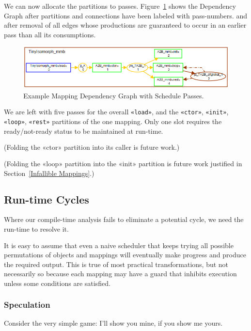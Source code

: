 \documentclass{jot}
\begin{document}
We can now allocate the partitions to passes. Figure~\ref{fig:TinyIsomorphFinal} shows the Dependency Graph after partitions and connections have been labeled with pass-numbers.  and after removal of all edges whose productions are guaranteed to occur in an earlier pass than all its consumptions.  

\begin{figure}[h]
	\centering
	\includegraphics[width=1.0\textwidth]{TinyIsomorphFinal.png}
	\caption{Example Mapping Dependency Graph with Schedule Passes.}
	\label{fig:TinyIsomorphFinal}
\end{figure}

We are left with five passes for the overall \verb|«load»|, and the \verb|«ctor»|, \verb|«init»|, \verb|«loop»|, \verb|«rest»| partitions of the one mapping. Only one slot requires the ready/not-ready status to be maintained at run-time.

(Folding the «ctor» partition into its caller is future work.)

(Folding the «loop» partition into the «init» partition is future work justified in Section~\ref{Infallible Mappings}.)

\subsection{Run-time Cycles}

Where our compile-time analysis fails to eliminate a potential cycle, we need the run-time to resolve it.

It is easy to assume that even a naive scheduler that keeps trying all possible permutations of objects and mappings will eventually make progress and produce the required output. This is true of most practical transformations, but not necessarily so because each mapping may have a guard that inhibits execution unless some conditions are satisfied.

\subsubsection{Speculation}

Consider the very simple game: I'll show you mine, if you show me yours.
\end{document}
